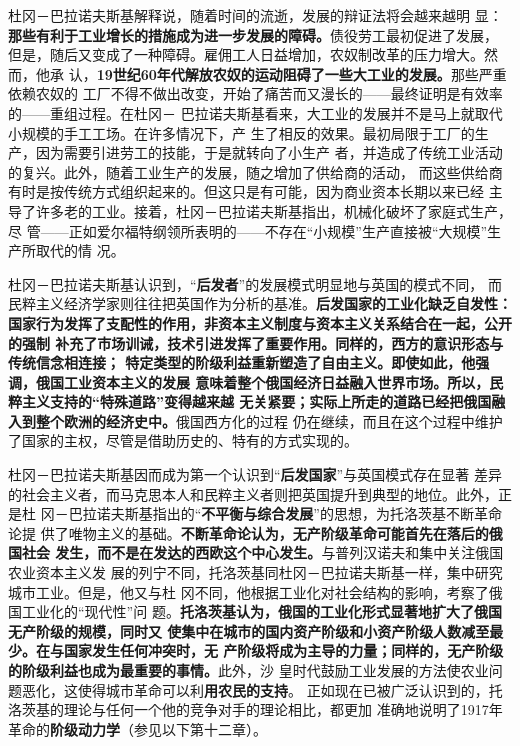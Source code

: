 杜冈－巴拉诺夫斯基解释说，随着时间的流逝，发展的辩证法将会越来越明
显：\textbf{那些有利于工业增长的措施成为进一步发展的障碍。}债役劳工最初促进了发展，
但是，随后又变成了一种障碍。雇佣工人日益增加，农奴制改革的压力增大。然而，他承
认，\textbf{19世纪60年代解放农奴的运动阻碍了一些大工业的发展。}那些严重依赖农奴的
工厂不得不做出改变，开始了痛苦而又漫长的——最终证明是有效率的——重组过程。在杜冈－
巴拉诺夫斯基看来，大工业的发展并不是马上就取代小规模的手工工场。在许多情况下，产
生了相反的效果。最初局限于工厂的生产，因为需要引进劳工的技能，于是就转向了小生产
者，并造成了传统工业活动的复兴。此外，随着工业生产的发展，随之增加了供给商的活动，
而这些供给商有时是按传统方式组织起来的。但这只是有可能，因为商业资本长期以来已经
主导了许多老的工业。接着，杜冈－巴拉诺夫斯基指出，机械化破坏了家庭式生产，尽
管——正如爱尔福特纲领所表明的——不存在“小规模”生产直接被“大规模”生产所取代的情
况。

杜冈－巴拉诺夫斯基认识到，“\textbf{后发者}”的发展模式明显地与英国的模式不同，
而民粹主义经济学家则往往把英国作为分析的基准。\textbf{后发国家的工业化缺乏自发性：
  国家行为发挥了支配性的作用，非资本主义制度与资本主义关系结合在一起，公开的强制
  补充了市场训诫，技术引进发挥了重要作用。同样的，西方的意识形态与传统信念相连接；
  特定类型的阶级利益重新塑造了自由主义。即使如此，他强调，俄国工业资本主义的发展
  意味着整个俄国经济日益融入世界市场。所以，民粹主义支持的“特殊道路”变得越来越
  无关紧要；实际上所走的道路已经把俄国融入到整个欧洲的经济史中。}俄国西方化的过程
仍在继续，而且在这个过程中维护了国家的主权，尽管是借助历史的、特有的方式实现的。

杜冈－巴拉诺夫斯基因而成为第一个认识到“\textbf{后发国家}”与英国模式存在显著
差异的社会主义者，而马克思本人和民粹主义者则把英国提升到典型的地位。此外，正是杜
冈－巴拉诺夫斯基指出的“\textbf{不平衡与综合发展}”的思想，为托洛茨基不断革命论提
供了唯物主义的基础。\textbf{不断革命论认为，无产阶级革命可能首先在落后的俄国社会
  发生，而不是在发达的西欧这个中心发生。}与普列汉诺夫和集中关注俄国农业资本主义发
展的列宁不同，托洛茨基同杜冈－巴拉诺夫斯基一样，集中研究城市工业。但是，他又与杜
冈不同，他根据工业化对社会结构的影响，考察了俄国工业化的“现代性”问
题。\textbf{托洛茨基认为，俄国的工业化形式显著地扩大了俄国无产阶级的规模，同时又
  使集中在城市的国内资产阶级和小资产阶级人数减至最少。在与国家发生任何冲突时，无
  产阶级将成为主导的力量；同样的，无产阶级的阶级利益也成为最重要的事情。}此外，沙
皇时代鼓励工业发展的方法使农业问题恶化，这使得城市革命可以利\textbf{用农民的支持}。
正如现在已被广泛认识到的，托洛茨基的理论与任何一个他的竞争对手的理论相比，都更加
准确地说明了1917年革命的\textbf{阶级动力学}（参见以下第十二章）。

